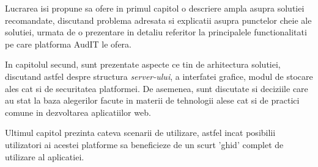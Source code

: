 Lucrarea isi propune sa ofere in primul capitol o descriere ampla asupra solutiei recomandate, discutand problema adresata si explicatii asupra punctelor cheie ale solutiei, urmata de o prezentare in detaliu referitor la principalele functionalitati pe care platforma AudIT le ofera.
\par In capitolul secund, sunt prezentate aspecte ce tin de arhitectura solutiei, discutand astfel despre structura \textit{server-ului}, a interfatei grafice, modul de stocare ales cat si de securitatea platformei. De asemenea, sunt discutate si deciziile care au stat la baza alegerilor facute in materii de tehnologii alese cat si de practici comune in dezvoltarea aplicatiilor  web.
\par  Ultimul capitol prezinta cateva scenarii de utilizare, astfel incat posibilii utilizatori ai acestei platforme sa beneficieze de un scurt 'ghid' complet  de utilizare al aplicatiei.


   

